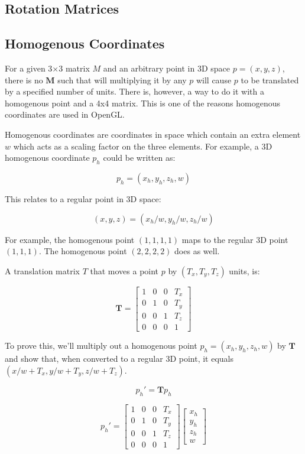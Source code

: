 \subsection{Rotation Matrices}

\subsection{Homogenous Coordinates}
For a given 3$\times$3 matrix $M$ and an arbitrary point in 3D space $p = (x, y, z)$, there is no $\mathbf{M}$ such that will multiplying it by any $p$ will cause $p$ to be translated by a specified number of units. There is, however, a way to do it with a homogenous point and a 4x4 matrix. This is one of the reasons homogenous coordinates are used in OpenGL.

Homogenous coordinates are coordinates in space which contain an extra element $w$ which acts as a scaling factor on the three elements. For example, a 3D homogenous coordinate $p_h$ could be written as:

\[ p_h = (x_h, y_h, z_h, w) \]

This relates to a regular point in 3D space:

\[ (x, y, z) = (x_h / w, y_h / w, z_h / w) \] 

For example, the homogenous point $(1, 1, 1, 1)$ maps to the regular 3D point $(1, 1, 1)$. The homogenous point $(2, 2, 2, 2)$ does as well.

A translation matrix $T$ that moves a point $p$  by $(T_x, T_y, T_z)$ units, is:

\[
\mathbf{T} = \begin{bmatrix}
1 & 0 & 0 & T_x \\
0 & 1 & 0 & T_y \\
0 & 0 & 1 & T_z \\
0 & 0 & 0 & 1
\end{bmatrix}
\]

To prove this, we'll multiply out a homogenous point $p_h = (x_h, y_h, z_h, w)$ by $\mathbf{T}$ and show that, when converted to a regular 3D point, it equals $(x/w + T_x, y/w + T_y, z/w + T_z)$.

\[ p_{h}\prime = \mathbf{T} p_h \]

\[
  p_{h}\prime = \begin{bmatrix}
1 & 0 & 0 & T_x \\
0 & 1 & 0 & T_y \\
0 & 0 & 1 & T_z \\
0 & 0 & 0 & 1
\end{bmatrix} 
\begin{bmatrix}
x_h \\ y_h \\ z_h \\ w 
\end{bmatrix}
\]

